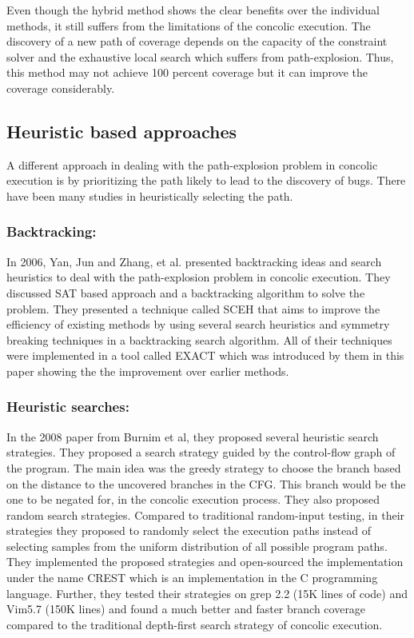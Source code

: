 \documentclass[ runningheads,
               a4paper]{llncs}
\begin{document}
Even though the hybrid method shows the clear benefits over the individual methods, it still suffers from the limitations of the concolic execution. The discovery of a new path of coverage depends on the capacity of the constraint solver and the exhaustive local search which suffers from path-explosion. Thus, this method may not achieve 100 percent coverage but it can improve the coverage considerably.




\subsection{Heuristic based approaches}
A different approach in dealing with the path-explosion problem in concolic execution is by prioritizing the path likely to lead to the discovery of bugs. There have been many studies in heuristically selecting the path.


\subsubsection{Backtracking:}
In 2006, Yan, Jun and Zhang, et al. presented \cite{yan2006backtracking} backtracking ideas and search heuristics to deal with the path-explosion problem in concolic execution. They discussed SAT based approach and a backtracking algorithm to solve the problem. They presented a technique called SCEH that aims to improve the efficiency of existing methods by using several search heuristics and symmetry breaking techniques in a backtracking search algorithm. All of their techniques were implemented in a tool called EXACT which was introduced by them in this paper showing the the improvement over earlier methods.


\subsubsection{Heuristic searches:}
In the 2008 paper \cite{kousik2008heuristic} from Burnim et al, they proposed several heuristic search strategies. They proposed a search strategy guided by the control-flow graph of the program. The main idea was the greedy strategy to choose the branch based on the distance to the uncovered branches in the CFG. This branch would be the one to be negated for, in the concolic execution process. They also proposed random search strategies. Compared to traditional random-input testing, in their strategies they proposed to randomly select the execution paths instead of selecting samples from the uniform distribution of all possible program paths. They implemented the proposed strategies and open-sourced the implementation under the name CREST which is an implementation in the C programming language. Further, they tested their strategies on grep 2.2 (15K lines of code) and Vim5.7 (150K lines) and found a much better and faster branch coverage compared to the traditional depth-first search strategy of concolic execution.
\end{document}
